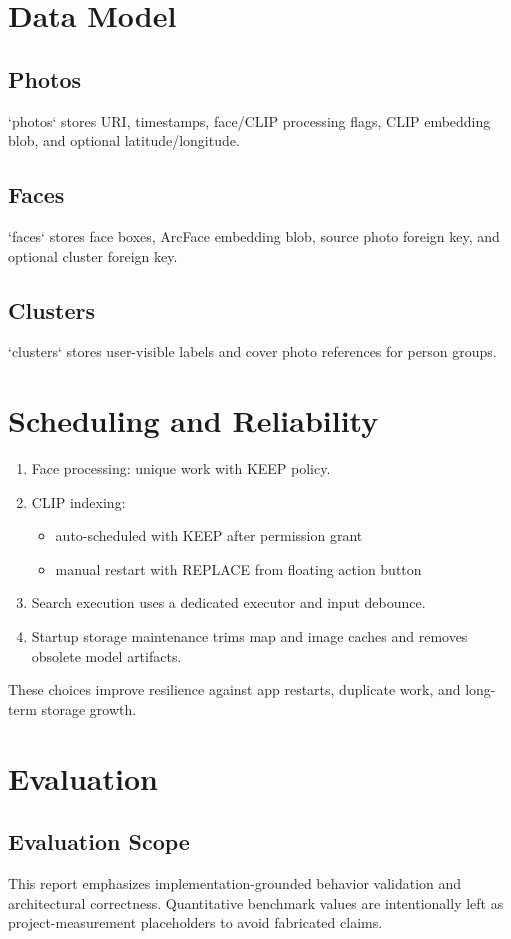 \documentclass[conference]{IEEEtran}
\begin{document}
\section{Data Model}
\subsection{Photos}
`photos` stores URI, timestamps, face/CLIP processing flags, CLIP embedding blob, and optional latitude/longitude.

\subsection{Faces}
`faces` stores face boxes, ArcFace embedding blob, source photo foreign key, and optional cluster foreign key.

\subsection{Clusters}
`clusters` stores user-visible labels and cover photo references for person groups.

\section{Scheduling and Reliability}
\begin{enumerate}
\item Face processing: unique work with KEEP policy.
\item CLIP indexing:
  \begin{itemize}
  \item auto-scheduled with KEEP after permission grant
  \item manual restart with REPLACE from floating action button
  \end{itemize}
\item Search execution uses a dedicated executor and input debounce.
\item Startup storage maintenance trims map and image caches and removes obsolete model artifacts.
\end{enumerate}

These choices improve resilience against app restarts, duplicate work, and long-term storage growth.

\section{Evaluation}
\subsection{Evaluation Scope}
This report emphasizes implementation-grounded behavior validation and architectural correctness. Quantitative benchmark values are intentionally left as project-measurement placeholders to avoid fabricated claims.
\end{document}
